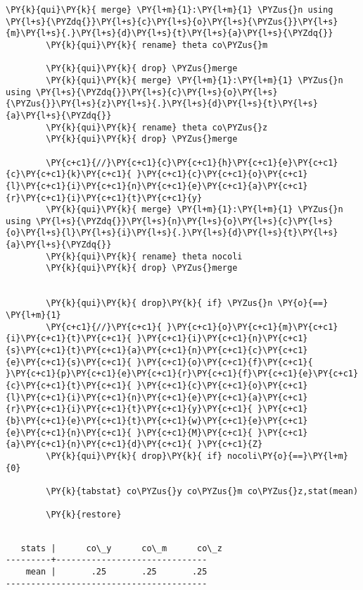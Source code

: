 \documentclass[11pt,notitlepage]{article}\usepackage[]{graphicx}\usepackage[]{color}
\makeatletter
\newenvironment{kframe}{%
 \def\at@end@of@kframe{}%
 \ifinner\ifhmode%
  \def\at@end@of@kframe{\end{minipage}}%
  \begin{minipage}{\columnwidth}%
 \fi\fi%
 \def\FrameCommand##1{\hskip\@totalleftmargin \hskip-\fboxsep
 \colorbox{shadecolor}{##1}\hskip-\fboxsep
     \hskip-\linewidth \hskip-\@totalleftmargin \hskip\columnwidth}%
 \MakeFramed {\advance\hsize-\width
   \@totalleftmargin\z@ \linewidth\hsize
   \@setminipage}}%
 {\par\unskip\endMakeFramed%
 \at@end@of@kframe}
\newenvironment{knitrout}{}{} %
\makeatother
\begin{document}
\begin{enumerate}[a)]
\begin{knitrout}
\begin{kframe}
\begin{Verbatim}[commandchars=\\\{\}]
        \PY{k}{qui}\PY{k}{ merge} \PY{l+m}{1}:\PY{l+m}{1} \PYZus{}n using \PY{l+s}{\PYZdq{}}\PY{l+s}{c}\PY{l+s}{o}\PY{l+s}{\PYZus{}}\PY{l+s}{m}\PY{l+s}{.}\PY{l+s}{d}\PY{l+s}{t}\PY{l+s}{a}\PY{l+s}{\PYZdq{}}
        \PY{k}{qui}\PY{k}{ rename} theta co\PYZus{}m 
        
        \PY{k}{qui}\PY{k}{ drop} \PYZus{}merge
        \PY{k}{qui}\PY{k}{ merge} \PY{l+m}{1}:\PY{l+m}{1} \PYZus{}n using \PY{l+s}{\PYZdq{}}\PY{l+s}{c}\PY{l+s}{o}\PY{l+s}{\PYZus{}}\PY{l+s}{z}\PY{l+s}{.}\PY{l+s}{d}\PY{l+s}{t}\PY{l+s}{a}\PY{l+s}{\PYZdq{}}
        \PY{k}{qui}\PY{k}{ rename} theta co\PYZus{}z 
        \PY{k}{qui}\PY{k}{ drop} \PYZus{}merge
        
        \PY{c+c1}{//}\PY{c+c1}{c}\PY{c+c1}{h}\PY{c+c1}{e}\PY{c+c1}{c}\PY{c+c1}{k}\PY{c+c1}{ }\PY{c+c1}{c}\PY{c+c1}{o}\PY{c+c1}{l}\PY{c+c1}{i}\PY{c+c1}{n}\PY{c+c1}{e}\PY{c+c1}{a}\PY{c+c1}{r}\PY{c+c1}{i}\PY{c+c1}{t}\PY{c+c1}{y}
        \PY{k}{qui}\PY{k}{ merge} \PY{l+m}{1}:\PY{l+m}{1} \PYZus{}n using \PY{l+s}{\PYZdq{}}\PY{l+s}{n}\PY{l+s}{o}\PY{l+s}{c}\PY{l+s}{o}\PY{l+s}{l}\PY{l+s}{i}\PY{l+s}{.}\PY{l+s}{d}\PY{l+s}{t}\PY{l+s}{a}\PY{l+s}{\PYZdq{}}
        \PY{k}{qui}\PY{k}{ rename} theta nocoli
        \PY{k}{qui}\PY{k}{ drop} \PYZus{}merge
        
        
        \PY{k}{qui}\PY{k}{ drop}\PY{k}{ if} \PYZus{}n \PY{o}{==} \PY{l+m}{1} 
        \PY{c+c1}{//}\PY{c+c1}{ }\PY{c+c1}{o}\PY{c+c1}{m}\PY{c+c1}{i}\PY{c+c1}{t}\PY{c+c1}{ }\PY{c+c1}{i}\PY{c+c1}{n}\PY{c+c1}{s}\PY{c+c1}{t}\PY{c+c1}{a}\PY{c+c1}{n}\PY{c+c1}{c}\PY{c+c1}{e}\PY{c+c1}{s}\PY{c+c1}{ }\PY{c+c1}{o}\PY{c+c1}{f}\PY{c+c1}{ }\PY{c+c1}{p}\PY{c+c1}{e}\PY{c+c1}{r}\PY{c+c1}{f}\PY{c+c1}{e}\PY{c+c1}{c}\PY{c+c1}{t}\PY{c+c1}{ }\PY{c+c1}{c}\PY{c+c1}{o}\PY{c+c1}{l}\PY{c+c1}{i}\PY{c+c1}{n}\PY{c+c1}{e}\PY{c+c1}{a}\PY{c+c1}{r}\PY{c+c1}{i}\PY{c+c1}{t}\PY{c+c1}{y}\PY{c+c1}{ }\PY{c+c1}{b}\PY{c+c1}{e}\PY{c+c1}{t}\PY{c+c1}{w}\PY{c+c1}{e}\PY{c+c1}{e}\PY{c+c1}{n}\PY{c+c1}{ }\PY{c+c1}{M}\PY{c+c1}{ }\PY{c+c1}{a}\PY{c+c1}{n}\PY{c+c1}{d}\PY{c+c1}{ }\PY{c+c1}{Z}
        \PY{k}{qui}\PY{k}{ drop}\PY{k}{ if} nocoli\PY{o}{==}\PY{l+m}{0}
        
        \PY{k}{tabstat} co\PYZus{}y co\PYZus{}m co\PYZus{}z,stat(mean)
        
        \PY{k}{restore}
\end{Verbatim}

    \begin{Verbatim}[commandchars=\\\{\}]

   stats |      co\_y      co\_m      co\_z
---------+------------------------------
    mean |       .25       .25       .25
----------------------------------------



\end{Verbatim}
\end{kframe}
\end{knitrout}
\end{enumerate}
\end{document}
